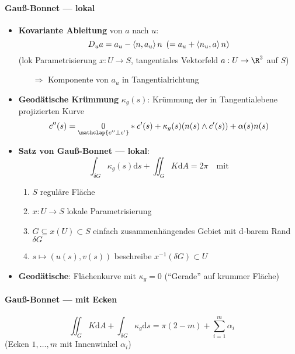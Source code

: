\paragraph{Gauß-Bonnet --- lokal}
\begin{itemize}
  \item \textbf{Kovariante Ableitung} von \( a \) nach \( u \):
  \begin{equation*}
    D_u a = a_u - \left\langle n,a_u \right\rangle n \enskip (= a_u + \left\langle n_u, a \right\rangle n)
  \end{equation*}
  (lok Parametrisierung \( x: U \to S \), tangentiales Vektorfeld \( a: U \to \R^3 \) auf \( S \))
  \begin{itemize}
    \item[\( \Rightarrow \)] Komponente von \( a_u \) in Tangentialrichtung
  \end{itemize}
  \item \textbf{Geodätische Krümmung} \( \kappa_g(s) \): Krümmung der in Tangentialebene projizierten Kurve
  \begin{equation*}
    c''(s) = \underset{\mathclap{c'' \perp c'}}{0}*c'(s) + \kappa_g(s)(n(s) \wedge c'(s)) + \alpha(s)n(s) 
  \end{equation*}
  \item \textbf{Satz von Gauß-Bonnet --- lokal}:
  \begin{equation*}
    \int_{\delta G} \kappa_g(s)\text{d}s + \iint_G K\text{d}A = 2\pi \quad \text{mit}
  \end{equation*}
  \begin{enumerate}
    \item \( S \) reguläre Fläche
    \item \( x: U \to S \) lokale Parametrisierung
    \item \( G \subseteq x(U) \subset S \) einfach zusammenhängendes Gebiet mit d-barem Rand \( \delta G \)
    \item \( s \mapsto (u(s),v(s)) \) beschreibe \( x^{-1}(\delta G) \subset U \)
  \end{enumerate}
  \item \textbf{Geodätische}: Flächenkurve mit \( \kappa_g = 0 \) (``Gerade'' auf krummer Fläche)
\end{itemize}

\paragraph{Gauß-Bonnet --- mit Ecken}
\begin{equation*}
  \iint_G K\text{d}A + \int_{\delta G} \kappa_g \text{d}s = \pi(2-m)+\sum_{i=1}^m \alpha_i
\end{equation*}
(Ecken \( 1,\dots,m \) mit Innenwinkel \( \alpha_i \))

